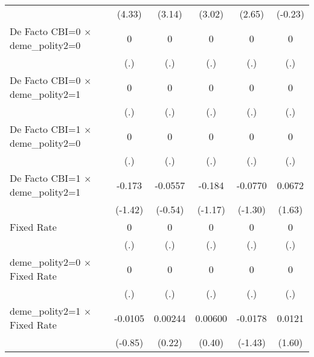 \begin{table}[htbp]
\begin{tabular}{l*{5}{c}}
                                        &   (4.33)         &   (3.14)         &   (3.02)         &   (2.65)         &  (-0.23)         \\
\addlinespace
De Facto CBI=0 $\times$ deme\_polity2=0  &        0         &        0         &        0         &        0         &        0         \\
                                        &      (.)         &      (.)         &      (.)         &      (.)         &      (.)         \\
\addlinespace
De Facto CBI=0 $\times$ deme\_polity2=1  &        0         &        0         &        0         &        0         &        0         \\
                                        &      (.)         &      (.)         &      (.)         &      (.)         &      (.)         \\
\addlinespace
De Facto CBI=1 $\times$ deme\_polity2=0  &        0         &        0         &        0         &        0         &        0         \\
                                        &      (.)         &      (.)         &      (.)         &      (.)         &      (.)         \\
\addlinespace
De Facto CBI=1 $\times$ deme\_polity2=1  &   -0.173         &  -0.0557         &   -0.184         &  -0.0770         &   0.0672         \\
                                        &  (-1.42)         &  (-0.54)         &  (-1.17)         &  (-1.30)         &   (1.63)         \\
\addlinespace
Fixed Rate                              &        0         &        0         &        0         &        0         &        0         \\
                                        &      (.)         &      (.)         &      (.)         &      (.)         &      (.)         \\
\addlinespace
deme\_polity2=0 $\times$ Fixed Rate      &        0         &        0         &        0         &        0         &        0         \\
                                        &      (.)         &      (.)         &      (.)         &      (.)         &      (.)         \\
\addlinespace
deme\_polity2=1 $\times$ Fixed Rate      &  -0.0105         &  0.00244         &  0.00600         &  -0.0178         &   0.0121         \\
                                        &  (-0.85)         &   (0.22)         &   (0.40)         &  (-1.43)         &   (1.60)         \\

\end{tabular}
\end{table}
